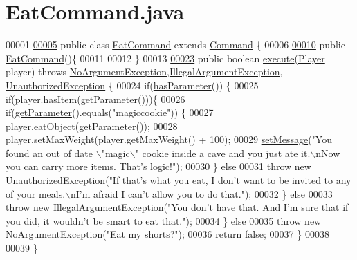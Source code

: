 \hypertarget{EatCommand_8java_source}{\section{Eat\-Command.\-java}
}

\begin{DoxyCode}
00001 
\hypertarget{EatCommand_8java_source_l00005}{}\hyperlink{classEatCommand}{00005} \textcolor{keyword}{public} \textcolor{keyword}{class }\hyperlink{classEatCommand}{EatCommand} \textcolor{keyword}{extends} \hyperlink{classCommand}{Command} \{
00006 
\hypertarget{EatCommand_8java_source_l00010}{}\hyperlink{classEatCommand_ab142bb810d8beeb46c478148143182e7}{00010}     \textcolor{keyword}{public} \hyperlink{classEatCommand_ab142bb810d8beeb46c478148143182e7}{EatCommand}()\{
00011 
00012     \}
00013 
\hypertarget{EatCommand_8java_source_l00023}{}\hyperlink{classEatCommand_ab78ece6b005359a83696998a37f0ae71}{00023}     \textcolor{keyword}{public} \textcolor{keywordtype}{boolean} \hyperlink{classEatCommand_ab78ece6b005359a83696998a37f0ae71}{execute}(\hyperlink{classPlayer}{Player} player) \textcolor{keywordflow}{throws} 
      \hyperlink{classNoArgumentException}{NoArgumentException},\hyperlink{classIllegalArgumentException}{IllegalArgumentException},
      \hyperlink{classUnauthorizedException}{UnauthorizedException} \{
00024         \textcolor{keywordflow}{if}(\hyperlink{classCommand_a9b042558156d6749566e0fd9d48d3bfe}{hasParameter}()) \{
00025             \textcolor{keywordflow}{if}(player.hasItem(\hyperlink{classCommand_a1ced3739d546770ba1389e6ce228255e}{getParameter}()))\{
00026                 \textcolor{keywordflow}{if}(\hyperlink{classCommand_a1ced3739d546770ba1389e6ce228255e}{getParameter}().equals(\textcolor{stringliteral}{"magiccookie"})) \{
00027                     player.eatObject(\hyperlink{classCommand_a1ced3739d546770ba1389e6ce228255e}{getParameter}());
00028                     player.setMaxWeight(player.getMaxWeight() + 100);
00029                     \hyperlink{classCommand_a715709d8f0ab65879d79ad1725c96f17}{setMessage}(\textcolor{stringliteral}{"You found an out of date \(\backslash\)"magic\(\backslash\)" cookie inside a cave and you
       just ate it.\(\backslash\)nNow you can carry more items. That's logic!"});
00030                 \} \textcolor{keywordflow}{else}
00031                     \textcolor{keywordflow}{throw} \textcolor{keyword}{new} \hyperlink{classUnauthorizedException}{UnauthorizedException}(\textcolor{stringliteral}{"If that's what you eat, I don't
       want to be invited to any of your meals.\(\backslash\)nI'm afraid I can't allow you to do that."});
00032             \} \textcolor{keywordflow}{else} 
00033                 \textcolor{keywordflow}{throw} \textcolor{keyword}{new} \hyperlink{classIllegalArgumentException}{IllegalArgumentException}(\textcolor{stringliteral}{"You don't have that. And I'm
       sure that if you did, it wouldn't be smart to eat that."});
00034         \} \textcolor{keywordflow}{else} 
00035             \textcolor{keywordflow}{throw} \textcolor{keyword}{new} \hyperlink{classNoArgumentException}{NoArgumentException}(\textcolor{stringliteral}{"Eat my shorts?"});
00036         \textcolor{keywordflow}{return} \textcolor{keyword}{false};
00037     \}
00038 
00039 \}
\end{DoxyCode}

